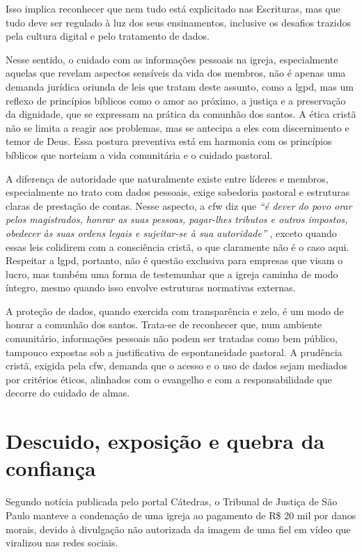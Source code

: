 Isso implica reconhecer que nem tudo está explicitado nas Escrituras, mas que tudo deve ser regulado à luz dos seus ensinamentos, inclusive os desafios trazidos pela cultura digital e pelo tratamento de dados.

Nesse sentido, o cuidado com as informações pessoais na igreja, especialmente aquelas que revelam aspectos sensíveis da vida dos membros, não é apenas uma demanda jurídica oriunda de leis que tratam deste assunto, como a \gls{lgpd}, mas um reflexo de princípios bíblicos como o amor ao próximo, a justiça e a preservação da dignidade, que se expressam na prática da comunhão dos santos. A ética cristã não se limita a reagir aos problemas, mas se antecipa a eles com discernimento e temor de Deus. Essa postura preventiva está em harmonia com os princípios bíblicos que norteiam a vida comunitária e o cuidado pastoral.

A diferença de autoridade que naturalmente existe entre líderes e membros, especialmente no trato com dados pessoais, exige sabedoria pastoral e estruturas claras de prestação de contas. Nesse aspecto, a \gls{cfw} diz que \textit{``é dever do povo orar pelos magistrados, honrar as suas pessoas, pagar-lhes tributos e outros impostos, obedecer às suas ordens legais e sujeitar-se à sua autoridade''} \cite[Cap.~XXIII]{cfw}, exceto quando essas leis colidirem com a consciência cristã, o que claramente não é o caso aqui. Respeitar a \gls{lgpd}, portanto, não é questão exclusiva para empresas que visam o lucro, mas também uma forma de testemunhar que a igreja caminha de modo íntegro, mesmo quando isso envolve estruturas normativas externas.

A proteção de dados, quando exercida com transparência e zelo, é um modo de honrar a comunhão dos santos. Trata-se de reconhecer que, num ambiente comunitário, informações pessoais não podem ser tratadas como bem público, tampouco expostas sob a justificativa de espontaneidade pastoral. A prudência cristã, exigida pela \gls{cfw}, demanda que o acesso e o uso de dados sejam mediados por critérios éticos, alinhados com o evangelho e com a responsabilidade que decorre do cuidado de almas.

\section{Descuido, exposição e quebra da confiança}

Segundo notícia publicada pelo portal Cátedras, o Tribunal de Justiça de São Paulo manteve a condenação de uma igreja ao pagamento de R\$ 20 mil por danos morais, devido à divulgação não autorizada da imagem de uma fiel em vídeo que viralizou nas redes sociais. \cite{catedras2024}

